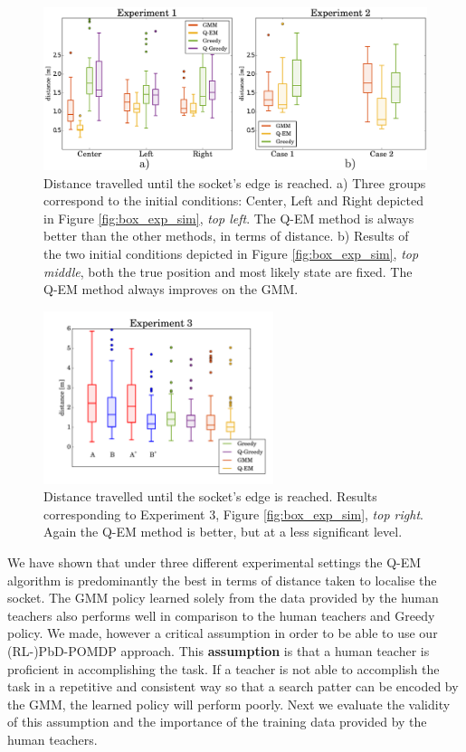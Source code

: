 \begin{figure}
 \centering
  \includegraphics[width=\textwidth]{./ch4-PiH/Figures/Fig/experiment_1_2.pdf}
  \caption{Distance travelled until the socket's edge is reached. a) Three groups correspond to the initial conditions: Center, Left and Right
   depicted in Figure \ref{fig:box_exp_sim}, \textit{top left}. The Q-EM method is always better than the other methods, in terms of distance. b)
   Results of the two initial conditions depicted in Figure \ref{fig:box_exp_sim}, \textit{top middle}, both the true position and most likely state are
   fixed. The Q-EM method always improves on the GMM. }
   \label{fig:three_searches}
\end{figure}
\begin{figure}
 \centering
  \includegraphics[width=0.6\textwidth]{./ch4-PiH/Figures/Fig/experiment3_plot2.pdf}
  \caption{Distance travelled until the socket's edge is reached. Results corresponding to Experiment 3, Figure \ref{fig:box_exp_sim}, \textit{top right}.
   Again the Q-EM method is better, but at a less significant level.}
   \label{fig:three_searches_exp3}
\end{figure}
 

We have shown that under three different experimental settings the Q-EM algorithm is predominantly the best in terms of distance taken 
to localise the socket. The GMM policy learned solely from the data provided by the human teachers also performs well in comparison to  
the human teachers and Greedy policy. We made, however a critical assumption in order to be able to use our (RL-)PbD-POMDP approach. 
This \textbf{assumption} is that a human teacher is proficient in accomplishing the task. If a teacher is not able to accomplish 
the task in a repetitive and consistent way so that a search patter can be encoded by the GMM, the learned policy will perform poorly.
Next we evaluate the validity of this assumption and the importance of the training data provided by the human teachers.
% 
